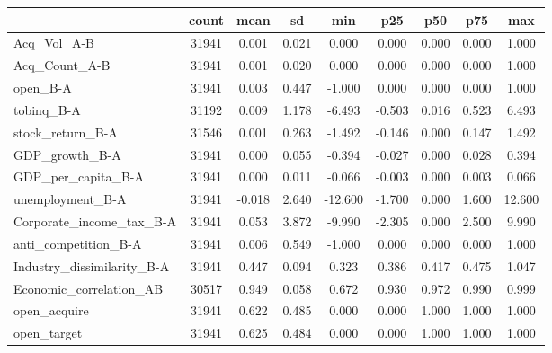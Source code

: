 {
\def\sym#1{\ifmmode^{#1}\else\(^{#1}\)\fi}
\begin{tabular}{l*{1}{cccccccc}}
\toprule
                    &       count&        mean&          sd&         min&         p25&         p50&         p75&         max\\
\midrule
Acq\_Vol\_A-B         &       31941&       0.001&       0.021&       0.000&       0.000&       0.000&       0.000&       1.000\\
Acq\_Count\_A-B       &       31941&       0.001&       0.020&       0.000&       0.000&       0.000&       0.000&       1.000\\
open\_B-A            &       31941&       0.003&       0.447&      -1.000&       0.000&       0.000&       0.000&       1.000\\
tobinq\_B-A          &       31192&       0.009&       1.178&      -6.493&      -0.503&       0.016&       0.523&       6.493\\
stock\_return\_B-A    &       31546&       0.001&       0.263&      -1.492&      -0.146&       0.000&       0.147&       1.492\\
GDP\_growth\_B-A      &       31941&       0.000&       0.055&      -0.394&      -0.027&       0.000&       0.028&       0.394\\
GDP\_per\_capita\_B-A  &       31941&       0.000&       0.011&      -0.066&      -0.003&       0.000&       0.003&       0.066\\
unemployment\_B-A    &       31941&      -0.018&       2.640&     -12.600&      -1.700&       0.000&       1.600&      12.600\\
Corporate\_income\_tax\_B-A&       31941&       0.053&       3.872&      -9.990&      -2.305&       0.000&       2.500&       9.990\\
anti\_competition\_B-A&       31941&       0.006&       0.549&      -1.000&       0.000&       0.000&       0.000&       1.000\\
Industry\_dissimilarity\_B-A&       31941&       0.447&       0.094&       0.323&       0.386&       0.417&       0.475&       1.047\\
Economic\_correlation\_AB&       30517&       0.949&       0.058&       0.672&       0.930&       0.972&       0.990&       0.999\\
open\_acquire        &       31941&       0.622&       0.485&       0.000&       0.000&       1.000&       1.000&       1.000\\
open\_target         &       31941&       0.625&       0.484&       0.000&       0.000&       1.000&       1.000&       1.000\\

\end{tabular}}
